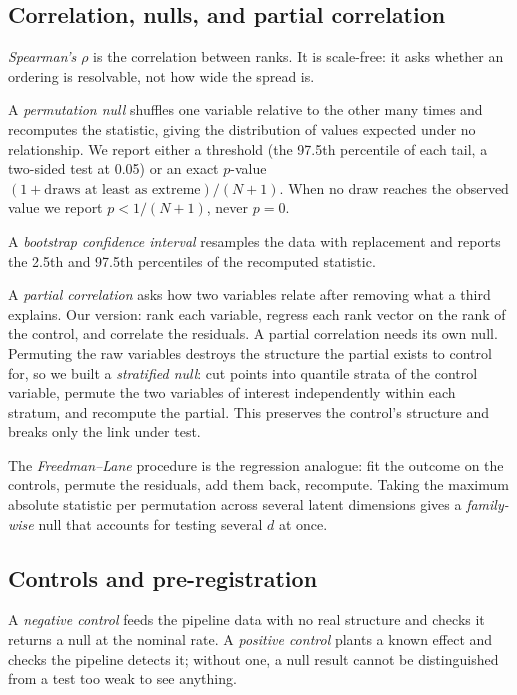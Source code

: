 \documentclass[11pt,a4paper]{article}
\begin{document}
\subsection{Correlation, nulls, and partial correlation}

\emph{Spearman's $\rho$} is the correlation between ranks. It is scale-free: it asks whether an ordering is resolvable, not how wide the spread is.

A \emph{permutation null} shuffles one variable relative to the other many times and recomputes the statistic, giving the distribution of values expected under no relationship. We report either a threshold (the 97.5th percentile of each tail, a two-sided test at 0.05) or an exact $p$-value $(1 + \text{draws at least as extreme})/(N+1)$. When no draw reaches the observed value we report $p < 1/(N+1)$, never $p = 0$.

A \emph{bootstrap confidence interval} resamples the data with replacement and reports the 2.5th and 97.5th percentiles of the recomputed statistic.

A \emph{partial correlation} asks how two variables relate after removing what a third explains. Our version: rank each variable, regress each rank vector on the rank of the control, and correlate the residuals. A partial correlation needs its own null. Permuting the raw variables destroys the structure the partial exists to control for, so we built a \emph{stratified null}: cut points into quantile strata of the control variable, permute the two variables of interest independently within each stratum, and recompute the partial. This preserves the control's structure and breaks only the link under test.

The \emph{Freedman--Lane} procedure is the regression analogue: fit the outcome on the controls, permute the residuals, add them back, recompute. Taking the maximum absolute statistic per permutation across several latent dimensions gives a \emph{family-wise} null that accounts for testing several $d$ at once.

\subsection{Controls and pre-registration}

A \emph{negative control} feeds the pipeline data with no real structure and checks it returns a null at the nominal rate. A \emph{positive control} plants a known effect and checks the pipeline detects it; without one, a null result cannot be distinguished from a test too weak to see anything.
\end{document}

